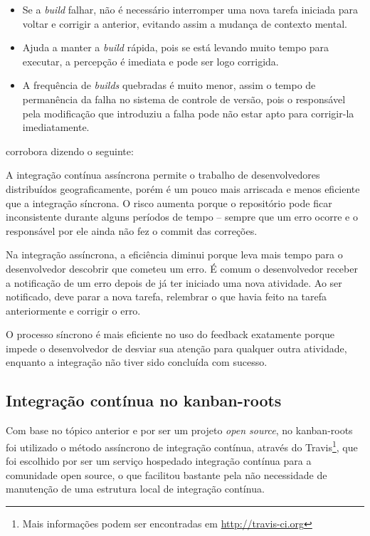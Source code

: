 \begin{itemize}
  \item Se a \textit{build} falhar, não é necessário interromper uma nova tarefa iniciada para voltar e corrigir a anterior, evitando assim a mudança de contexto mental.
  \item Ajuda a manter a \textit{build} rápida, pois se está levando muito tempo para executar, a percepção é imediata e pode ser logo corrigida.
  \item A frequência de \textit{builds} quebradas é muito menor, assim o tempo de permanência da falha no sistema de controle de versão, pois o responsável pela modificação que introduziu a falha pode não estar apto para corrigir-la imediatamente.
\end{itemize}

 corrobora dizendo o seguinte:

\begin{citacao}
A integração contínua assíncrona permite o trabalho de desenvolvedores distribuídos geograficamente, porém é um pouco mais arriscada e menos eficiente que a integração síncrona. O risco aumenta porque o repositório pode ficar inconsistente durante alguns períodos de tempo – sempre que um erro ocorre e o responsável por ele ainda não fez o commit das correções.

Na integração assíncrona, a eficiência diminui porque leva mais tempo para o desenvolvedor descobrir que cometeu um erro. É comum o desenvolvedor receber a notificação de um erro depois de já ter iniciado uma nova atividade. Ao ser notificado, deve parar a nova tarefa, relembrar o que havia feito na tarefa anteriormente e corrigir o erro.

O processo síncrono é mais eficiente no uso do feedback exatamente porque impede o desenvolvedor de desviar sua atenção para qualquer outra atividade, enquanto a integração não tiver sido concluída com sucesso.
\end{citacao}


\subsection{Integração contínua no kanban-roots} %
\label{sub:integracao_continua_no_kanban}

Com base no tópico anterior e por ser um projeto \textit{open source}, no kanban-roots foi utilizado o método assíncrono de integração contínua, através do Travis\footnote{Mais informações podem ser encontradas em \url{http://travis-ci.org}}, que foi escolhido por ser um serviço hospedado integração contínua para a comunidade open source, o que facilitou bastante pela não necessidade de manutenção de uma estrutura local de integração contínua.


